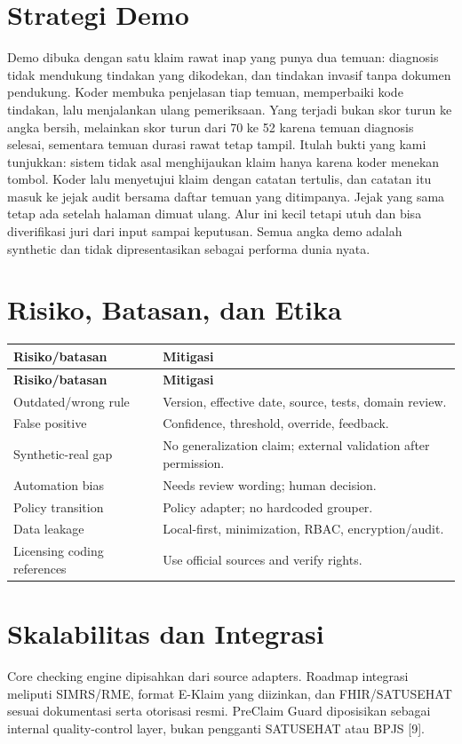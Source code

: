 \documentclass[11pt,a4paper]{article}
\begin{document}
\section{Strategi Demo}
Demo dibuka dengan satu klaim rawat inap yang punya dua temuan: diagnosis tidak mendukung tindakan yang dikodekan, dan tindakan invasif tanpa dokumen pendukung. Koder membuka penjelasan tiap temuan, memperbaiki kode tindakan, lalu menjalankan ulang pemeriksaan. Yang terjadi bukan skor turun ke angka bersih, melainkan skor turun dari 70 ke 52 karena temuan diagnosis selesai, sementara temuan durasi rawat tetap tampil. Itulah bukti yang kami tunjukkan: sistem tidak asal menghijaukan klaim hanya karena koder menekan tombol. Koder lalu menyetujui klaim dengan catatan tertulis, dan catatan itu masuk ke jejak audit bersama daftar temuan yang ditimpanya. Jejak yang sama tetap ada setelah halaman dimuat ulang. Alur ini kecil tetapi utuh dan bisa diverifikasi juri dari input sampai keputusan. Semua angka demo adalah synthetic dan tidak dipresentasikan sebagai performa dunia nyata.

\section{Risiko, Batasan, dan Etika}
\begin{longtable}{|p{5cm}|p{10cm}|}
\hline
\rowcolor{blue!15} \textbf{Risiko/batasan} & \textbf{Mitigasi} \\ \hline
\endfirsthead
\hline
\rowcolor{blue!15} \textbf{Risiko/batasan} & \textbf{Mitigasi} \\ \hline
\endhead
Outdated/wrong rule & Version, effective date, source, tests, domain review. \\ \hline
False positive & Confidence, threshold, override, feedback. \\ \hline
Synthetic-real gap & No generalization claim; external validation after permission. \\ \hline
Automation bias & Needs review wording; human decision. \\ \hline
Policy transition & Policy adapter; no hardcoded grouper. \\ \hline
Data leakage & Local-first, minimization, RBAC, encryption/audit. \\ \hline
Licensing coding references & Use official sources and verify rights. \\ \hline
\end{longtable}
\section{Skalabilitas dan Integrasi}
Core checking engine dipisahkan dari source adapters. Roadmap integrasi meliputi SIMRS/RME, format E-Klaim yang diizinkan, dan FHIR/SATUSEHAT sesuai dokumentasi serta otorisasi resmi. PreClaim Guard diposisikan sebagai internal quality-control layer, bukan pengganti SATUSEHAT atau BPJS [9].
\end{document}
